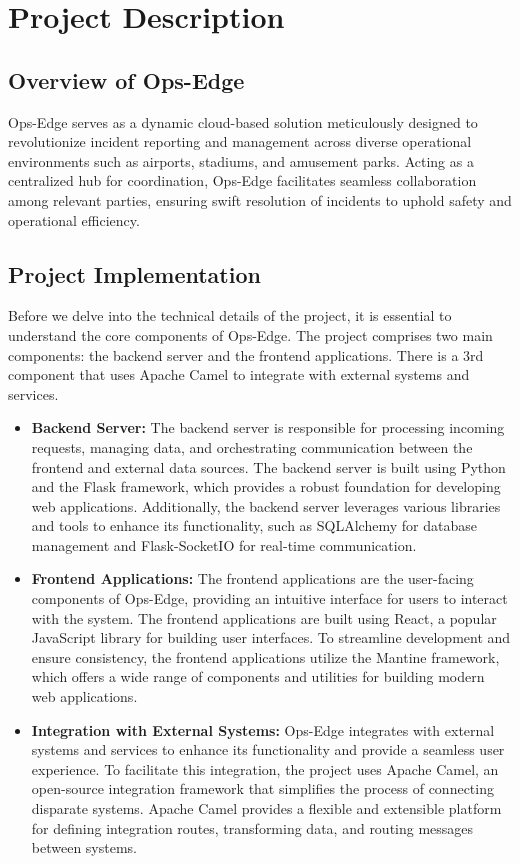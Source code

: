 \chapter{Project Description}
\label{ch:project_description}

\section{Overview of Ops-Edge}
\label{sec:project_description:overview}
Ops-Edge serves as a dynamic cloud-based solution meticulously designed to revolutionize incident reporting and management across diverse operational environments such as airports, stadiums, and amusement parks. Acting as a centralized hub for coordination, Ops-Edge facilitates seamless collaboration among relevant parties, ensuring swift resolution of incidents to uphold safety and operational efficiency.

%
%
\section{Project Implementation}
\label{sec:project_description:project_implementation}
Before we delve into the technical details of the project, it is essential to understand the core components of Ops-Edge. The project comprises two main components: the backend server and the frontend applications. There is a 3rd component that uses Apache Camel to integrate with external systems and services.

\begin{itemize}
    \item \textbf{Backend Server:} The backend server is responsible for processing incoming requests, managing data, and orchestrating communication between the frontend and external data sources. The backend server is built using Python and the Flask framework, which provides a robust foundation for developing web applications. Additionally, the backend server leverages various libraries and tools to enhance its functionality, such as SQLAlchemy for database management and Flask-SocketIO for real-time communication.

    \item \textbf{Frontend Applications:} The frontend applications are the user-facing components of Ops-Edge, providing an intuitive interface for users to interact with the system. The frontend applications are built using React, a popular JavaScript library for building user interfaces. To streamline development and ensure consistency, the frontend applications utilize the Mantine framework, which offers a wide range of components and utilities for building modern web applications.

    \item \textbf{Integration with External Systems:} Ops-Edge integrates with external systems and services to enhance its functionality and provide a seamless user experience. To facilitate this integration, the project uses Apache Camel, an open-source integration framework that simplifies the process of connecting disparate systems. Apache Camel provides a flexible and extensible platform for defining integration routes, transforming data, and routing messages between systems.
\end{itemize}